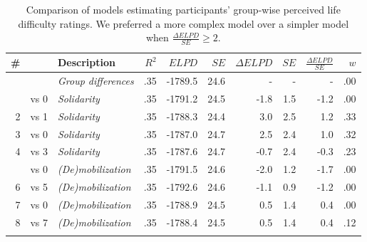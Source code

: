 \documentclass[12pt, a4paper]{article}
\begin{document}
\begin{table}
\centering
{}
\caption{
Comparison of models estimating participants' group-wise perceived life difficulty ratings. We preferred a more complex model over a simpler model when $\frac{\Delta\textit{ELPD}}{\textit{SE}} \geq 2$.
}
\small	
\begin{tabularx}{\linewidth}{r@{~}rXrrrrrrr} \toprule
\# &  &  Description & $R^2$ & $\textit{ELPD}$ & $\textit{SE}$ & $\Delta\textit{ELPD}$ & $\textit{SE}$ & $\frac{\Delta\textit{ELPD}}{\textit{SE}}$ & $w$ \\ \midrule \addlinespace
0 &      & \textit{Group differences} & .35 & -1789.5 & 24.6 & - & - & - & .00 \\ \addlinespace
1 & vs 0 & \textit{Solidarity}       & .35 & -1791.2 & 24.5 & -1.8 & 1.5 & -1.2 & .00 \\
2 & vs 1 & \textit{Solidarity}       & .35 & -1788.3 & 24.4 & 3.0 & 2.5 & 1.2 & .33 \\
3 & vs 0 & \textit{Solidarity}       & .35 & -1787.0 & 24.7 & 2.5 & 2.4 & 1.0 & .32 \\
4 & vs 3 & \textit{Solidarity}       & .35 & -1787.6 & 24.7 & -0.7 & 2.4 & -0.3 & .23 \\ \addlinespace
5 & vs 0 & \textit{(De)mobilization} & .35 & -1791.5 & 24.6 & -2.0 & 1.2 & -1.7 & .00 \\
6 & vs 5 & \textit{(De)mobilization} & .35 & -1792.6 & 24.6 & -1.1 & 0.9 & -1.2 & .00 \\
7 & vs 0 & \textit{(De)mobilization} & .35 & -1788.9 & 24.5 & 0.5 & 1.4 & 0.4 & .00 \\
8 & vs 7 & \textit{(De)mobilization} & .35 & -1788.4 & 24.5 & 0.5 & 1.4 & 0.4 & .12 \\ \addlinespace \bottomrule
\end{tabularx}
\label{tab:e-2}
\end{table}
\end{document}
